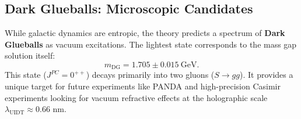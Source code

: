\subsection{Dark Glueballs: Microscopic Candidates}
\label{subsec:glueballs}

While galactic dynamics are entropic, the theory predicts a spectrum of \textbf{Dark Glueballs} as vacuum excitations. The lightest state corresponds to the mass gap solution itself:
\begin{equation}
\label{eq:glueball_mass}
m_{\mathrm{DG}} = 1.705 \pm 0.015~\mathrm{GeV}.
\end{equation}
This state ($J^{PC} = 0^{++}$) decays primarily into two gluons ($S \to gg$). It provides a unique target for future experiments like PANDA and high-precision Casimir experiments looking for vacuum refractive effects at the holographic scale $\lambda_{\mathrm{UIDT}} \approx 0.66$ nm.